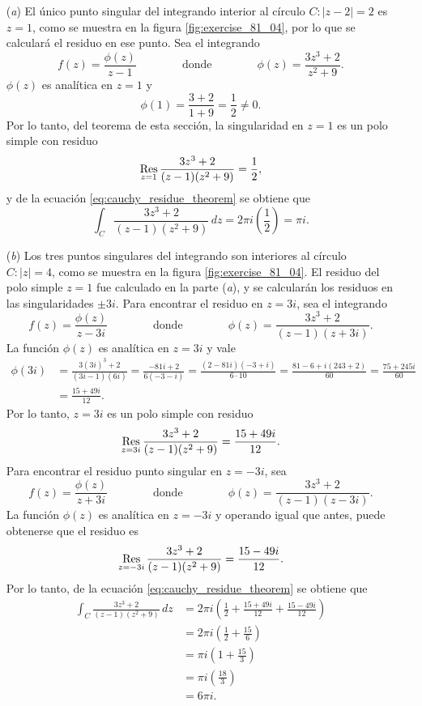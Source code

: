 \documentclass[a4paper]{report}
\def\Res{\qopname\relax m{Res}}
\begin{document}
\begin{enumerate}
 \item[(\textit{a})] El único punto singular del integrando interior al círculo \(C:|z-2|=2\) es \(z=1\), como se muestra en la figura \ref{fig:exercise_81_04}, por lo que se calculará el residuo en ese punto. Sea el integrando
 \[
  f(z)=\frac{\phi(z)}{z-1}
  \qquad\qquad\textrm{donde}\qquad\qquad
  \phi(z)=\frac{3z^3+2}{z^2+9}.
 \]
 \(\phi(z)\) es analítica en \(z=1\) y 
 \[
  \phi(1)=\frac{3+2}{1+9}=\frac{1}{2}\neq0.
 \]
 Por lo tanto, del teorema de esta sección, la singularidad en \(z=1\) es un polo simple con residuo
 \[
  \Res_{z=1}\frac{3z^3+2}{(z-1)(z^2+9)}=\frac{1}{2},
 \]
 y de la ecuación \ref{eq:cauchy_residue_theorem} se obtiene que 
 \[
  \int_C\frac{3z^3+2}{(z-1)(z^2+9)}\,dz=2\pi i\left(\frac{1}{2}\right)=\pi i.
 \]
 \item[(\textit{b})] Los tres puntos singulares del integrando son interiores al círculo \(C:|z|=4\), como se muestra en la figura \ref{fig:exercise_81_04}. El residuo del polo simple \(z=1\) fue calculado en la parte (\textit{a}), y se calcularán los residuos en las singularidades \(\pm3i\). Para encontrar el residuo en \(z=3i\), sea el integrando
 \[
  f(z)=\frac{\phi(z)}{z-3i}
  \qquad\qquad\textrm{donde}\qquad\qquad
  \phi(z)=\frac{3z^3+2}{(z-1)(z+3i)}.
 \]
 La función \(\phi(z)\) es analítica en \(z=3i\) y vale 
 \begin{align*}
  \phi(3i)&=\frac{3(3i)^3+2}{(3i-1)(6i)}=\frac{-81i+2}{6(-3-i)}=\frac{(2-81i)(-3+i)}{6\cdot10}
     =\frac{81-6+i(243+2)}{60}=\frac{75+245i}{60}\\
     &=\frac{15+49i}{12}. 
 \end{align*}
 Por lo tanto, \(z=3i\) es un polo simple con residuo
 \[
  \Res_{z=3i}\frac{3z^3+2}{(z-1)(z^2+9)}=\frac{15+49i}{12}.
 \]
 Para encontrar el residuo punto singular en \(z=-3i\), sea 
 \[
  f(z)=\frac{\phi(z)}{z+3i}
  \qquad\qquad\textrm{donde}\qquad\qquad
  \phi(z)=\frac{3z^3+2}{(z-1)(z-3i)}.
 \]
 La función \(\phi(z)\) es analítica en \(z=-3i\) y operando igual que antes, puede obtenerse que el residuo es
 \[
  \Res_{z=-3i}\frac{3z^3+2}{(z-1)(z^2+9)}=\frac{15-49i}{12}.
 \]
 Por lo tanto, de la ecuación \ref{eq:cauchy_residue_theorem} se obtiene que 
 \begin{align*}
  \int_C\frac{3z^3+2}{(z-1)(z^2+9)}\,dz&=2\pi i\left(\frac{1}{2}+\frac{15+49i}{12}+\frac{15-49i}{12}\right)\\
   &=2\pi i\left(\frac{1}{2}+\frac{15}{6}\right)\\
   &=\pi i\left(1+\frac{15}{3}\right)\\
   &=\pi i\left(\frac{18}{3}\right)\\
   &=6\pi i.
 \end{align*}
\end{enumerate}
\end{document}
